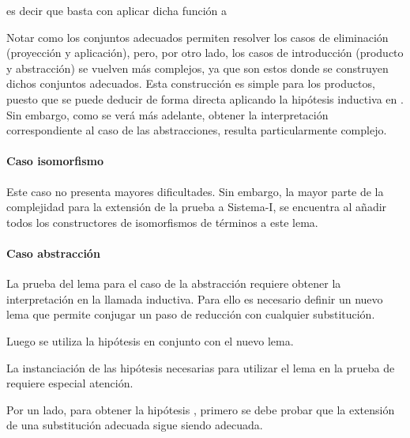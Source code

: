 es decir que basta con aplicar dicha función a 


Notar como los conjuntos adecuados permiten resolver los casos de eliminación (proyección y aplicación), pero, por otro lado, los casos de introducción (producto y abstracción) se vuelven más complejos, ya que son estos donde se construyen dichos conjuntos adecuados.
Esta construcción es simple para los productos, puesto que se puede deducir de forma directa aplicando la hipótesis inductiva en .	
Sin embargo, como se verá más adelante, obtener la interpretación correspondiente al caso de las abstracciones, resulta particularmente complejo.

\paragraph{Caso isomorfismo}

Este caso no presenta mayores dificultades. Sin embargo, la mayor parte de la complejidad para la extensión de la prueba a Sistema-I, se encuentra al añadir todos los constructores de isomorfismos de términos a este lema.


\paragraph{Caso abstracción}

La prueba del lema para el caso de la abstracción requiere obtener la interpretación  en la llamada inductiva.
Para ello es necesario definir un nuevo lema que permite conjugar un paso de reducción con cualquier substitución.


Luego se utiliza la hipótesis  en conjunto con el nuevo lema.


La instanciación de las hipótesis necesarias para utilizar el lema en la prueba de  requiere especial atención.

Por un lado, para obtener la hipótesis \snstar {}, primero se debe probar que la extensión de una substitución adecuada sigue siendo adecuada.

